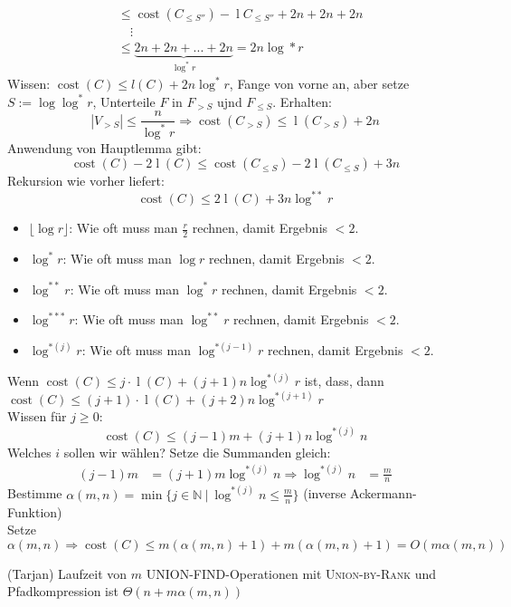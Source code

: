\begin{itemize}
\begin{itemize}
\begin{align*}
                                                       &\leq \operatorname{cost}(C_{\leq S''}) - \operatorname{l}{C_{\leq S''}} + 2n + 2n + 2n\\
                                                       & \quad \vdots\\
                                                       &\leq \underbrace{2n + 2n + ... + 2n}_{\log^{*} r} = 2n \log * r
         \end{align*}
         Wissen: $\operatorname{cost}(C) \leq l(C) + 2n \log^{*} r$, 
         Fange von vorne an, aber setze $S := \log \log^{*} r$,
         Unterteile $F$ in $F_{>S}$ ujnd $F_{\leq S}$.
         Erhalten: 
         \[|V_{>S}| \leq \frac{n}{\log^{*} r} \Rightarrow \operatorname{cost}(C_{>S}) \leq \operatorname{l}(C_{>S}) + 2n\]
         Anwendung von Hauptlemma gibt:
         \newcommand{\cost}{\operatorname{cost}}
         \renewcommand{\l}{\operatorname{l}}
         \[\cost(C)- 2 \l(C) \leq \cost(C_{\leq S}) - 2 \l(C_{\leq S}) + 3 n\]
         Rekursion wie vorher liefert:
         \[\cost(C) \leq 2 \l(C) + 3n \log^{**} r\]
         
\begin{itemize}
 \item $\lfloor \log r \rfloor$: Wie oft muss man $\frac{r}{2}$ rechnen, damit Ergebnis $< 2$.
 \item $\log^{*} r$: Wie oft muss man $\log r$ rechnen, damit Ergebnis $< 2$.
 \item $\log^{**} r$: Wie oft muss man $\log^{*} r$ rechnen, damit Ergebnis $< 2$.
 \item $\log^{***} r$: Wie oft muss man $\log^{**} r$ rechnen, damit Ergebnis $< 2$.
 \item $\log^{*(j)} r$: Wie oft muss man $\log^{*(j-1)} r$ rechnen, damit Ergebnis $< 2$.
\end{itemize}
Wenn $\cost(C) \leq j \cdot \l(C) + (j+1)n \log^{*(j)} r$ ist, dass, dann $\cost(C) \leq (j+1) \cdot \l(C) + (j+2)n \log^{*(j+1)} r$\\
    Wissen für $j \geq 0$:
    \[\cost(C) \leq (j - 1) m + (j + 1) n \log^{*(j)} n\]
    Welches $i$ sollen wir wählen? Setze die Summanden gleich:
    \begin{align*}
     (j - 1) m &= (j+1) m \log^{*(j)} n
     \Rightarrow \log^{*(j)} n &= \frac{m}{n} \tag{Nimm an $m \geq n$, o. B. d. A.}
    \end{align*}
    Bestimme $\alpha(m,n) = \min\{ j \in \mathbb{N}\ |\ \log^{*(j)} n \leq \frac{m}{n}\}$ (inverse Ackermann-Funktion)\\
    Setze $\alpha(m,n) \Rightarrow \cost(C) \leq m(\alpha(m,n) + 1) + m(\alpha(m,n) + 1) = O(m \alpha(m,n))$
     \end{itemize}
\Satz (Tarjan) Laufzeit von $m$ UNION-FIND-Operationen mit \textsc{Union-by-Rank} und Pfadkompression ist $\Theta(n + m \alpha(m,n))$

\end{itemize}
